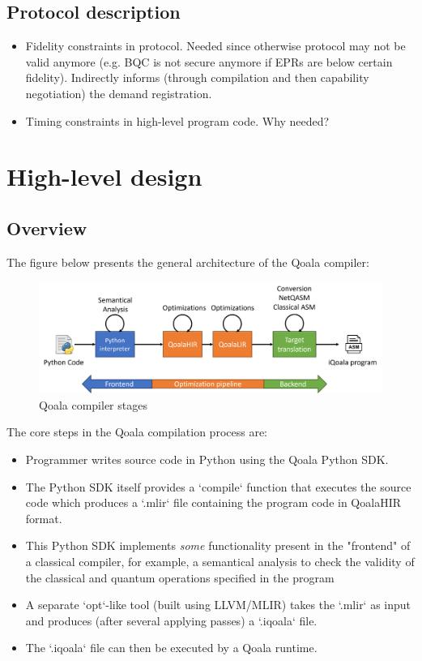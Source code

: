 \subsection{Protocol description}
\begin{itemize}
    \item Fidelity constraints in protocol. Needed since otherwise protocol may not be valid anymore (e.g. BQC is not secure anymore if EPRs are below certain fidelity). Indirectly informs (through compilation and then capability negotiation) the demand registration.
    \item Timing constraints in high-level program code. Why needed?
\end{itemize}



\section{High-level design}

\subsection{Overview}
The figure below presents the general architecture of the Qoala compiler:

\begin{figure}[ht]
    \centering
    \includegraphics[scale=1.0]{figures/compiler/compiler-arch.png}
    \caption{Qoala compiler stages}
    \label{fig:qoala_compiler_stages}
\end{figure}


The core steps in the Qoala compilation process are:

\begin{itemize}
\item Programmer writes source code in Python using the Qoala Python SDK.
\item The Python SDK itself provides a `compile` function that executes the source code
  which produces a `.mlir` file containing the program code in QoalaHIR format.
\item This Python SDK implements \textit{some} functionality present in the "frontend" of a classical
  compiler, for example, a semantical analysis to check the validity of the classical and
  quantum operations specified in the program 
\item A separate `opt`-like tool (built using LLVM/MLIR) takes the `.mlir` as input and produces
  (after several applying passes) a `.iqoala` file.
\item The `.iqoala` file can then be executed by a Qoala runtime.
\end{itemize}


